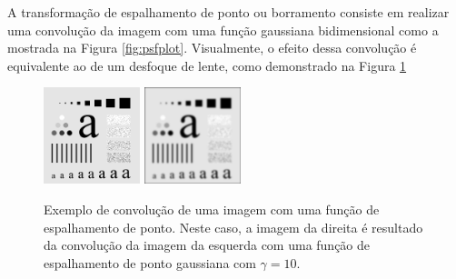 A transformação de espalhamento de ponto ou borramento consiste em realizar uma convolução da imagem com uma função gaussiana bidimensional como a mostrada na Figura \ref{fig:psfplot}.
Visualmente, o efeito dessa convolução é equivalente ao de um desfoque de lente, como demonstrado na Figura \ref{fig:psfexample}

\begin{figure}[H]
	\centering
	\caption{\label{fig:psfexample}Exemplo de convolução de uma imagem com uma função de espalhamento de ponto.
	Neste caso, a imagem da direita é resultado da convolução da imagem da esquerda com uma função de espalhamento de ponto gaussiana com $\gamma = 10$.}
	\includegraphics[width = 0.25\textwidth]{./figures/psfexample0.png}
	\includegraphics[width = 0.25\textwidth]{./figures/psfexample1.png}
\end{figure}

